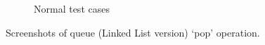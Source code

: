 \begin{figure}[!ht]
\begin{subfigure}{0.34\textwidth}
		\caption{Normal test cases}\label{fig:queue_ll_pop_normal}
	\end{subfigure}
	\caption{Screenshots of queue (Linked List version) `pop' operation.}\label{fig:queue_ll_pop_cases}
\end{figure}